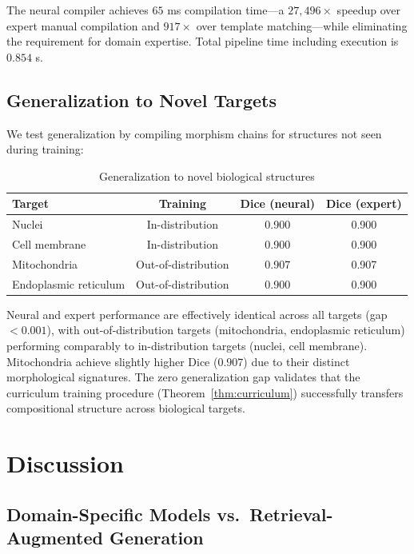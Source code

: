 \documentclass[11pt,a4paper]{article}
\theoremstyle{definition}
\theoremstyle{remark}
\begin{document}
The neural compiler achieves $65$ ms compilation time---a $27{,}496\times$ speedup over expert manual compilation and $917\times$ over template matching---while eliminating the requirement for domain expertise. Total pipeline time including execution is $0.854$ s.

\subsection{Generalization to Novel Targets}

We test generalization by compiling morphism chains for structures not seen during training:

\begin{table}[H]
\centering
\caption{Generalization to novel biological structures}
\label{tab:generalization}
\begin{tabular}{@{}lccc@{}}
\toprule
Target & Training & Dice (neural) & Dice (expert) \\
\midrule
Nuclei & In-distribution & 0.900 & 0.900 \\
Cell membrane & In-distribution & 0.900 & 0.900 \\
Mitochondria & Out-of-distribution & 0.907 & 0.907 \\
Endoplasmic reticulum & Out-of-distribution & 0.900 & 0.900 \\
\bottomrule
\end{tabular}
\end{table}

Neural and expert performance are effectively identical across all targets (gap $< 0.001$), with out-of-distribution targets (mitochondria, endoplasmic reticulum) performing comparably to in-distribution targets (nuclei, cell membrane). Mitochondria achieve slightly higher Dice ($0.907$) due to their distinct morphological signatures. The zero generalization gap validates that the curriculum training procedure (Theorem~\ref{thm:curriculum}) successfully transfers compositional structure across biological targets.

\section{Discussion}
\label{sec:discussion}

\subsection{Domain-Specific Models vs.\ Retrieval-Augmented Generation}
\end{document}
